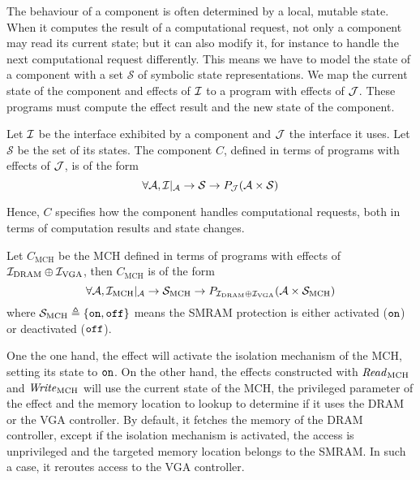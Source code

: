 The behaviour of a component is often determined by a local, mutable state.
%
When it computes the result of a computational request, not only a component may
read its current state; but it can also modify it, for instance to handle the
next computational request differently.
%
This means we have to model the state of a component with a set $\mathcal{S}$ of
symbolic state representations.
%
We map the current state of the component and effects of $\mathcal{I}$ to a program with
effects of $\mathcal{J}$.
%
These programs must compute the effect result and the new state of the
component.

\begin{definition}[Component] \label{def:freespec:component-model} Let $\mathcal{I}$ be
  the interface exhibited by a component and $\mathcal{J}$ the interface it uses.
  Let $\mathcal{S}$ be the set of its states.
  The component $C$, defined in terms of programs with effects of $\mathcal{J}$, is of
  the form
  \[ \forall \mathcal{A}, \mathcal{I}|_{\mathcal{A}} \rightarrow \mathcal{S}
    \rightarrow P_{\mathcal{J}}(\mathcal{A} \times \mathcal{S}) \]
\end{definition}

Hence, $C$ specifies how the component handles computational requests, both in
terms of computation results and state changes.

\begin{example} \label{ex:mch-specs} Let $C_{\mathrm{MCH}}$
  be the MCH defined in terms of programs with effects of
  $\mathcal{I}_{\mathrm{DRAM}} \oplus \mathcal{I}_{\mathrm{VGA}}$, then $C_{\mathrm{MCH}}$ is of
  the form
  \[
    \forall \mathcal{A}, \mathcal{I}_{\mathrm{MCH}}|_{\mathcal{A}} \rightarrow
    \mathcal{S}_{\mathrm{MCH}} \rightarrow P_{\mathcal{I}_{\mathrm{DRAM}} \oplus
      \mathcal{I}_{\mathrm{VGA}}}(\mathcal{A} \times \mathcal{S}_{\mathrm{MCH}})
  \] where $\mathcal{S}_{\mathrm{MCH}} \triangleq \{ \mathtt{on}, \mathtt{off} \}$
  means the SMRAM protection is either activated ($\mathtt{on}$) or deactivated
  ($\mathtt{off}$).

  One the one hand, the  effect will activate the isolation mechanism
  of the MCH, setting its state to $\mathtt{on}$.
  On the other hand, the effects constructed with $\mathit{Read}_{\mathrm{MCH}}$
  and $\mathit{Write}_{\mathrm{MCH}}$ will use the current state of the MCH, the
  privileged parameter of the effect and the memory location to lookup to
  determine if it uses the DRAM or the VGA controller.
  By default, it fetches the memory of the DRAM controller, except if the
  isolation mechanism is activated, the access is unprivileged and the targeted
  memory location belongs to the SMRAM.
  In such a case, it reroutes access to the VGA controller.
\end{example}


